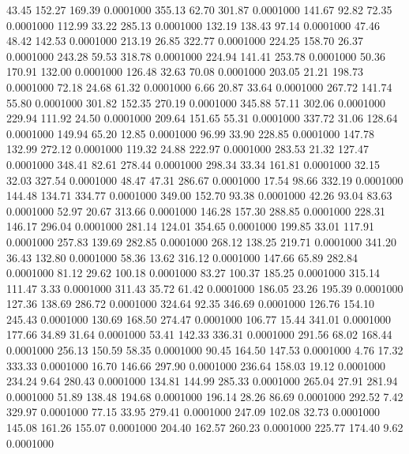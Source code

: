   43.45  152.27  169.39   0.0001000
 355.13   62.70  301.87   0.0001000
 141.67   92.82   72.35   0.0001000
 112.99   33.22  285.13   0.0001000
 132.19  138.43   97.14   0.0001000
  47.46   48.42  142.53   0.0001000
 213.19   26.85  322.77   0.0001000
 224.25  158.70   26.37   0.0001000
 243.28   59.53  318.78   0.0001000
 224.94  141.41  253.78   0.0001000
  50.36  170.91  132.00   0.0001000
 126.48   32.63   70.08   0.0001000
 203.05   21.21  198.73   0.0001000
  72.18   24.68   61.32   0.0001000
   6.66   20.87   33.64   0.0001000
 267.72  141.74   55.80   0.0001000
 301.82  152.35  270.19   0.0001000
 345.88   57.11  302.06   0.0001000
 229.94  111.92   24.50   0.0001000
 209.64  151.65   55.31   0.0001000
 337.72   31.06  128.64   0.0001000
 149.94   65.20   12.85   0.0001000
  96.99   33.90  228.85   0.0001000
 147.78  132.99  272.12   0.0001000
 119.32   24.88  222.97   0.0001000
 283.53   21.32  127.47   0.0001000
 348.41   82.61  278.44   0.0001000
 298.34   33.34  161.81   0.0001000
  32.15   32.03  327.54   0.0001000
  48.47   47.31  286.67   0.0001000
  17.54   98.66  332.19   0.0001000
 144.48  134.71  334.77   0.0001000
 349.00  152.70   93.38   0.0001000
  42.26   93.04   83.63   0.0001000
  52.97   20.67  313.66   0.0001000
 146.28  157.30  288.85   0.0001000
 228.31  146.17  296.04   0.0001000
 281.14  124.01  354.65   0.0001000
 199.85   33.01  117.91   0.0001000
 257.83  139.69  282.85   0.0001000
 268.12  138.25  219.71   0.0001000
 341.20   36.43  132.80   0.0001000
  58.36   13.62  316.12   0.0001000
 147.66   65.89  282.84   0.0001000
  81.12   29.62  100.18   0.0001000
  83.27  100.37  185.25   0.0001000
 315.14  111.47    3.33   0.0001000
 311.43   35.72   61.42   0.0001000
 186.05   23.26  195.39   0.0001000
 127.36  138.69  286.72   0.0001000
 324.64   92.35  346.69   0.0001000
 126.76  154.10  245.43   0.0001000
 130.69  168.50  274.47   0.0001000
 106.77   15.44  341.01   0.0001000
 177.66   34.89   31.64   0.0001000
  53.41  142.33  336.31   0.0001000
 291.56   68.02  168.44   0.0001000
 256.13  150.59   58.35   0.0001000
  90.45  164.50  147.53   0.0001000
   4.76   17.32  333.33   0.0001000
  16.70  146.66  297.90   0.0001000
 236.64  158.03   19.12   0.0001000
 234.24    9.64  280.43   0.0001000
 134.81  144.99  285.33   0.0001000
 265.04   27.91  281.94   0.0001000
  51.89  138.48  194.68   0.0001000
 196.14   28.26   86.69   0.0001000
 292.52    7.42  329.97   0.0001000
  77.15   33.95  279.41   0.0001000
 247.09  102.08   32.73   0.0001000
 145.08  161.26  155.07   0.0001000
 204.40  162.57  260.23   0.0001000
 225.77  174.40    9.62   0.0001000
